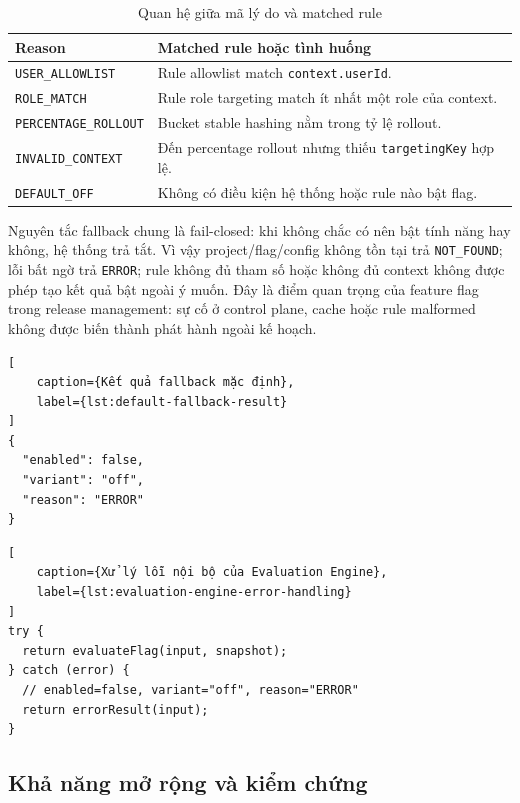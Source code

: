 \begin{table}[H]
    \centering
    \caption{Quan hệ giữa mã lý do và matched rule}
    \label{tab:reason-matched-rule}
    \begin{tabular}{p{} p{}}
        \toprule
        \textbf{Reason} & \textbf{Matched rule hoặc tình huống} \\
        \midrule
        \texttt{USER\_ALLOWLIST} & Rule allowlist match \texttt{context.userId}. \\
        \texttt{ROLE\_MATCH} & Rule role targeting match ít nhất một role của context. \\
        \texttt{PERCENTAGE\_ROLLOUT} & Bucket stable hashing nằm trong tỷ lệ rollout. \\
        \texttt{INVALID\_CONTEXT} & Đến percentage rollout nhưng thiếu \texttt{targetingKey} hợp lệ. \\
        \texttt{DEFAULT\_OFF} & Không có điều kiện hệ thống hoặc rule nào bật flag. \\
        \bottomrule
    \end{tabular}
\end{table}

Nguyên tắc fallback chung là fail-closed: khi không chắc có nên bật tính năng hay không, hệ thống trả tắt. Vì vậy project/flag/config không tồn tại trả \texttt{NOT\_FOUND}; lỗi bất ngờ trả \texttt{ERROR}; rule không đủ tham số hoặc không đủ context không được phép tạo kết quả bật ngoài ý muốn. Đây là điểm quan trọng của feature flag trong release management: sự cố ở control plane, cache hoặc rule malformed không được biến thành phát hành ngoài kế hoạch.

\begin{lstlisting}[
    caption={Kết quả fallback mặc định},
    label={lst:default-fallback-result}
]
{
  "enabled": false,
  "variant": "off",
  "reason": "ERROR"
}
\end{lstlisting}

\begin{lstlisting}[
    caption={Xử lý lỗi nội bộ của Evaluation Engine},
    label={lst:evaluation-engine-error-handling}
]
try {
  return evaluateFlag(input, snapshot);
} catch (error) {
  // enabled=false, variant="off", reason="ERROR"
  return errorResult(input);
}
\end{lstlisting}

\subsection{Khả năng mở rộng và kiểm chứng}

